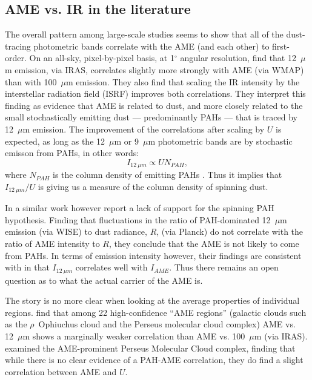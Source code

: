        \subsection{AME vs. IR in the literature}
          The overall pattern among large-scale studies seems to show that all of the dust-tracing photometric bands correlate with the AME (and each other) to first-order.  On an all-sky, pixel-by-pixel basis, at 1$^{\circ}$ angular resolution, \cite{ysard10b} find that 12~$\mu$m emission, via IRAS, correlates slightly more strongly with AME (via WMAP) than with 100~$\mu$m emission.  They also find that scaling the IR intensity by the interstellar radiation field (ISRF) improves both correlations. They interpret this finding as evidence that AME is related to dust, and more closely related to the small stochastically emitting dust --- predominantly PAHs --- that is traced by 12~$\mu$m emission. The improvement of the correlations after scaling by $U$ is expected, as long as the 12~$\mu$m or 9~$\mu$m photometric bands are by stochastic emisson from PAHs, in other words:
          \begin{equation}
            I_{12~\mu{}m} \propto{} UN_{PAH},
          \end{equation}
          where $N_{PAH}$ is the column density of emitting PAHs \citep{onaka00}. Thus it implies that $I_{12~\mu{}m}/U$ is giving us a measure of the column density of spinning dust.

          In a similar work however \cite{hensley16} report a lack of support for the spinning PAH hypothesis. Finding that fluctuations in the ratio of PAH-dominated 12~$\mu$m emission (via WISE) to dust radiance, $R$, (via Planck) do not correlate with the ratio of AME intensity to $R$, they conclude that the AME is not likely to come from PAHs. In terms of emission intensity however, their findings are consistent with \cite{ysard10b} in that $I_{12~\mu{}m}$ correlates well with $I_{AME}$. Thus there remains an open question as to what the actual carrier of the AME is.

         The story is no more clear when looking at the average properties of individual regions. \cite{planckXV} find that among 22 high-confidence ``AME regions'' (galactic clouds such as the $\rho$~Ophiuchus cloud and the Perseus molecular cloud complex) AME vs. 12~$\mu$m  shows a marginally weaker correlation than AME vs. 100~$\mu$m (via IRAS). \cite{tibbs11} examined the AME-prominent Perseus Molecular Cloud complex, finding that while there is no clear evidence of a PAH-AME correlation, they do find a slight correlation between AME and $U$.

